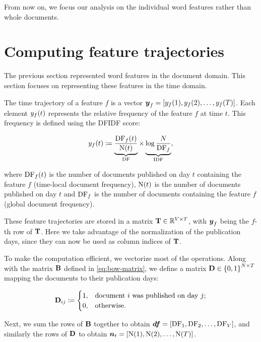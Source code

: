 From now on, we focus our analysis on the individual word features rather than whole documents.


\section{Computing feature trajectories}
The previous section represented word features in the document domain. This section focuses on representing these features in the time domain.

The time trajectory of a feature $f$ is a vector $\vect{\traj}_f = \left[ \traj_{f}(1), \traj_{f}(2), \dots, \traj_{f}(\streamlen) \right]$. Each element $y_{f}(t)$ represents the relative frequency of the feature $f$ at time $t$. This frequency is defined using the DFIDF score:

\begin{equation}
	y_{f}(t) \coloneqq \underbrace{\frac{\text{DF}_{f}(t)}{\text{N}(t)}}_{\text{DF}} \times \underbrace{\log{\frac{N}{\text{DF}_{f}}}}_{\text{IDF}},
\end{equation}

where $\text{DF}_{f}(t)$ is the number of documents published on day $t$ containing the feature $f$ (time-local document frequency), $\text{N}(t)$ is the number of documents published on day $t$ and $\text{DF}_{f}$ is the number of documents containing the feature $f$ (global document frequency).

These feature trajectories are stored in a matrix $\mathbf{T} \in \mathbb{R}^{V \times T}$, with $\vect{\traj}_f$ being the $f$-th row of $\mathbf{T}$. Here we take advantage of the normalization of the publication days, since they can now be used as column indices of $\mathbf{T}$.

To make the computation efficient, we vectorize most of the operations. Along with the matrix $\mathbf{B}$ defined in \ref{eq:bow-matrix}, we define a matrix $\mathbf{D} \in \left\{ 0, 1 \right\}^{N \times T}$ mapping the documents to their publication days:

\begin{equation}
	\mathbf{D}_{ij} \coloneqq
	\begin{cases}
		1, & \text{document}~i~\text{was published on day}~j \text{;} \\
		0, & \text{otherwise}.
	\end{cases}
\end{equation}

Next, we sum the rows of $\mathbf{B}$ together to obtain $\vect{\df} = \left[ \text{\df}_{1}, \text{\df}_{2}, \dots, \text{\df}_{\featcount} \right]$, and similarly the rows of $\mathbf{D}$ to obtain $\vect{\doccount}_{t} = \left[ \text{\doccount}(1), \text{\doccount}(2), \dots, \text{\doccount}(\streamlen) \right]$.

